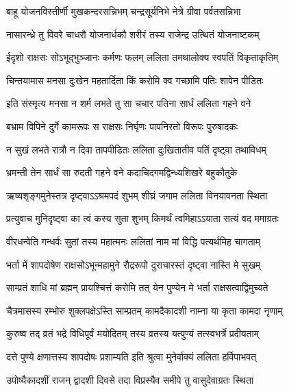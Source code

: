 \twolineshloka
{बाहू योजनविस्तीर्णी मुखकन्दरसन्निभम्}
{चन्द्रसूर्यनिभे नेत्रे ग्रीवा पर्वतसन्निभा} %

\twolineshloka
{नासारन्ध्रे तु विवरे चाधरौ योजनार्धकौ}
{शरीरं तस्य राजेन्द्र उत्थितं योजनाष्टकम्} %

\twolineshloka
{ईदृशो राक्षसः सोऽभूद्भुञ्जानः कर्मणः फलम्}
{ललिता तमथालोक्य स्वपतिं विकृताकृतिम्} %

\twolineshloka
{चिन्तयामास मनसा दुःखेन महतार्दिता}
{किं करोमि क्व गच्छामि पतिः शापेन पीडितः} %

\twolineshloka
{इति संस्मृत्य मनसा न शर्म लभते तु सा}
{चचार पतिना सार्धं ललिता गहने वने} %

\twolineshloka
{बभ्राम विपिने दुर्गे कामरूपः स राक्षसः}
{निर्घृणः पापनिरतो विरूपः पुरुषादकः} %

\twolineshloka
{न सुखं लभते रात्रौ न दिवा तापपीडितः}
{ललिता दुःखितातीव पतिं दृष्ट्वा तथाविधम्} %

\twolineshloka
{भ्रमन्ती तेन सार्धं सा रुदती गहने वने}
{कदाचिदगमद्विन्ध्यशिखरे बहुकौतुके} %

\twolineshloka
{ऋष्यशृङ्गमुनेस्तत्र दृष्ट्वाऽऽश्रमपदं शुभम्}
{शीघ्रं जगाम ललिता विनयावनता स्थिता} %

\twolineshloka
{प्रत्युवाच मुनिदृष्ट्वा का त्वं कस्य सुता शुभम्}
{किमर्थं त्वमिहाऽऽयाता सत्यं वद ममाग्रतः} %


\twolineshloka
{वीरधन्वेति गन्धर्वः सुतां तस्य महात्मनः}
{ललितां नाम मां विद्धि पत्यर्थमिह चागताम्} %

\twolineshloka
{भर्ता में शापदोषेण राक्षसोऽभून्महामुने}
{रौद्ररूपो दुराचारस्तं दृष्ट्वा नास्ति मे सुखम्} %

\twolineshloka
{साम्प्रतं शाधि मां ब्रह्मन् प्रायश्चित्तं करोमि तत्}
{येन पुण्येन मे भर्ता राक्षसत्वाद्विमुच्यते} %


\twolineshloka
{चैत्रमासस्य रम्भोरु शुक्लपक्षेऽस्ति साम्प्रतम्}
{कामदैकादशी नाम्ना या कृता कामदा नृणाम्} %

\twolineshloka
{कुरुष्व तद् व्रतं भद्रे विधिपूर्वं मयोदितम्}
{तस्य व्रतस्य यत्पुण्यं तत्स्वभर्त्रे प्रदीयताम्} %

\twolineshloka
{दत्ते पुण्ये क्षणात्तस्य शापदोषः प्रशाम्यति}
{इति श्रुत्वा मुनेर्वाक्यं ललिता हर्विपाभवत्} %

\twolineshloka
{उपोष्यैकादशीं राजन् द्वादशी दिवसे तदा}
{विप्रस्यैव समीपे तु वासुदेवाग्रतः स्थिता} %

